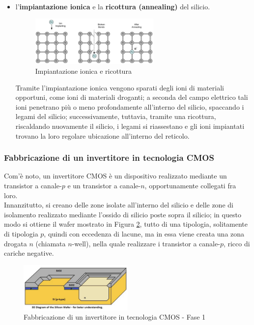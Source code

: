 \documentclass[a4paper]{extarticle}
\begin{document}
\begin{itemize}
    \item l'\textbf{impiantazione ionica} e la \textbf{ricottura (annealing)} del silicio.
    
    \begin{figure}[H]
        \centering
        \includegraphics[width=0.6\textwidth]{impiantazione-ionica-ricottura.png}
        \caption{Impiantazione ionica e ricottura}
        \label{fig:impiantazione_ionica_ricottura}
    \end{figure}

    \noindent
    Tramite l'impiantazione ionica vengono sparati degli ioni di materiali opportuni, come ioni di materiali droganti; a seconda del campo elettrico tali ioni penetrano più o meno profondamente all'interno del silicio, spaccando i legami del silicio; successivamente, tuttavia, tramite una ricottura, riscaldando nuovamente il silicio, i legami si riassestano e gli ioni impiantati trovano la loro regolare ubicazione all'interno del reticolo.
\end{itemize}

\vspace{1em}
\noindent
\subsubsection{Fabbricazione di un invertitore in tecnologia CMOS}
Com'è noto, un invertitore CMOS è un dispositivo realizzato mediante un transistor a canale-$p$ e un transistor a canale-$n$, opportunamente collegati fra loro.\\
Innanzitutto, si creano delle zone isolate all'interno del silicio e delle zone di isolamento realizzato mediante l'ossido di silicio poste sopra il silicio; in questo modo si ottiene il wafer mostrato in Figura \ref{fig:fabbricazione_invertitore_cmos_1}, tutto di una tipologia, solitamente di tipologia $p$, quindi con eccedenza di lacune, ma in essa viene creata una zona drogata $n$ (chiamata $n$-well), nella quale realizzare i transistor a canale-$p$, ricco di cariche negative.

\begin{figure}[H]
    \centering
    \includegraphics[width=0.5\textwidth]{fabbricazione-invertitore-cmos-1.png}
    \caption{Fabbricazione di un invertitore in tecnologia CMOS - Fase 1}
    \label{fig:fabbricazione_invertitore_cmos_1}
\end{figure}
\end{document}
